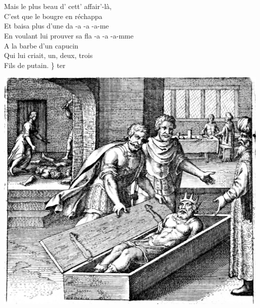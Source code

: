 \breakpage
\\\\Mais le plus beau d' cett' affair'-là, \bissimple
\\C'est que le bougre en réchappa \bissimple
\\Et baisa plus d'une da -a -a -a-me
\\En voulant lui prouver sa fla -a -a -a-mme
\\A la barbe d'un capucin \bissimple
\\Qui lui criait, un, deux, trois
\\Fils de putain. \} ter
\bigskip
\bigskip
\begin{center}
\includegraphics[width=1\textwidth]{images/brev58.png}
\end{center}
\breakpage